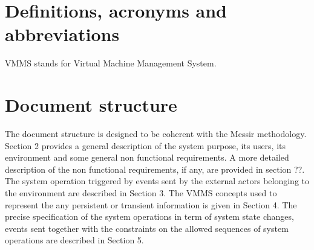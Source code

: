 \section{Definitions, acronyms and abbreviations}

VMMS stands for Virtual Machine Management System.

\section{Document structure} 

The document structure is designed to be coherent with the Messir methodology. Section
2 provides a general description of the system purpose, its users, its
environment and some general non functional requirements. A more detailed
description of the non functional requirements, if any, are provided in section
??. The system operation triggered by events sent by the external actors
belonging to the environment are described in Section 3. The VMMS concepts used
to represent the any persistent or transient information is given in Section 4.
The precise specification of the system operations in term of system state
changes, events sent together with the constraints on the allowed sequences of
system operations are described in Section 5.
